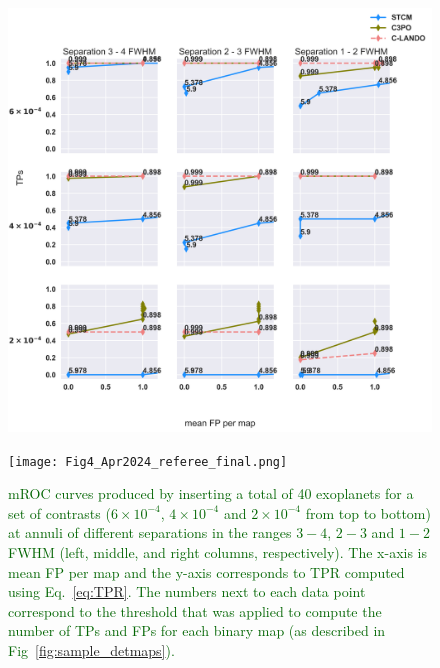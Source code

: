 \documentclass[referee]{aa} %
\newcommand{\newchange}[1]{\textcolor{darkgreen}{#1}}
\begin{document}
\begin{figure}
\centering
    \includegraphics[width=1.0\textwidth]{fig4_dec2023.png}
\end{figure}
\begin{figure}
\centering
    \texttt{[image: Fig4\_Apr2024\_referee\_final.png]}
\caption{ \newchange{mROC curves produced by inserting a total of 40 exoplanets for a set of contrasts ($6 \times 10^{-4}$, $4 \times 10^{-4}$ and $2 \times 10^{-4}$ from top to bottom) at annuli of different separations in the ranges $3-4$, $2-3$ and $1-2$ FWHM (left, middle, and right columns, respectively).
The x-axis is mean FP per map and the y-axis corresponds to TPR computed using Eq.~\ref{eq:TPR}. 
The numbers next to each data point correspond to the threshold that was applied to compute the number of TPs and FPs for each binary map (as described in Fig~\ref{fig:sample_detmaps}).
}}
    \label{fig:fig_4}
\end{figure}
\end{document}
